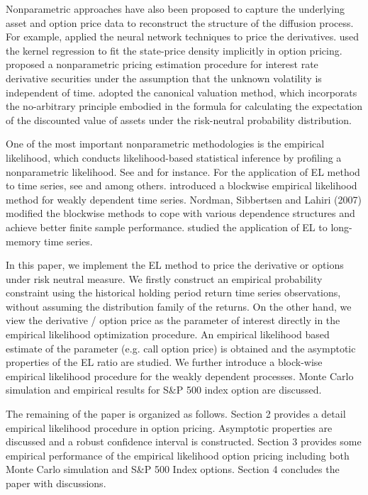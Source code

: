 Nonparametric approaches have also been proposed to capture the underlying
asset and option price data to reconstruct the structure of the diffusion
process. For example, \citet{hutchinson1994nonparametric} applied the
neural network techniques to price the derivatives. \citet{ait1998nonparametric} used the kernel regression to fit the state-price density
implicitly in option pricing. \citet{ait1996nonparametric} proposed a nonparametric
pricing estimation procedure for interest rate derivative securities
under the assumption that the unknown volatility is independent of
time. \citet{stutzer1996simple} adopted the canonical valuation method, which
incorporats the no-arbitrary principle embodied in the formula for
calculating the expectation of the discounted value of assets under
the risk-neutral probability distribution. %


One of the most important nonparametric methodologies is the empirical likelihood, which conducts likelihood-based statistical inference by profiling a nonparametric likelihood. See \citet{owen1988empirical,owen1990empirical,owen2010empirical,diciccio1989adjustments} and \citet{hall1990methodology} for instance. For the application of EL method to time series, see \citet{mykland1995dual,chuang2002empirical} and \citet{chan2006empirical} among others.  \citet{kitamura1997empirica} introduced a blockwise empirical likelihood method for weakly dependent time series. Nordman, Sibbertsen and Lahiri (2007) modified the blockwise methods to cope with various dependence structures and achieve better finite sample performance. \citet{yau2012empirical} studied the application of EL to long-memory time series. 

In this paper, we implement the EL method to price the derivative or options under risk neutral measure. We firstly construct an empirical probability constraint using the historical holding period return time series observations, without assuming the distribution family of the returns. On the other hand, we view the derivative / option price as the parameter of interest directly in the empirical likelihood optimization procedure. An empirical likelihood based estimate of the parameter (e.g. call option price) is obtained and the asymptotic properties of the EL ratio are studied. We further introduce a block-wise empirical likelihood procedure for the weakly dependent processes. Monte Carlo simulation and empirical results for S\&P 500 index option are discussed.     

The remaining of the paper is organized as follows. Section 2 provides a detail empirical likelihood procedure in option pricing. Asymptotic properties are discussed and a robust confidence interval is constructed. Section 3 provides some empirical performance of the empirical likelihood option pricing including both Monte Carlo simulation and S\&P 500 Index options. Section 4 concludes the paper with discussions.

